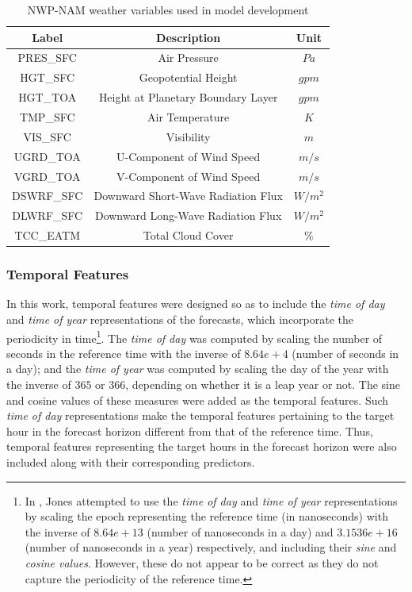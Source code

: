 \begin{table}[h]
\begin{center}
    \caption{NWP-NAM weather variables used in model development}
    \label{Tab:table_nam_variables}
    \begin{tabular}{ c c c}
    	\toprule
    	\textbf{Label} & \textbf{Description} & \textbf{Unit} \\
    	\midrule
    	PRES\_SFC & Air Pressure & $Pa$\\
    	HGT\_SFC & Geopotential Height & $gpm$ \\
    	HGT\_TOA & Height at Planetary Boundary Layer & $gpm$ \\
    	TMP\_SFC & Air Temperature & $K$\\
    	VIS\_SFC & Visibility & $m$\\
    	UGRD\_TOA & U-Component of Wind Speed & $m/s$\\
    	VGRD\_TOA & V-Component of Wind Speed & $m/s$\\
    	DSWRF\_SFC & Downward Short-Wave Radiation Flux & $W/m^2$\\
    	DLWRF\_SFC & Downward Long-Wave Radiation Flux & $W/m^2$\\
    	TCC\_EATM & Total Cloud Cover & $\%$ \\
    	\bottomrule
    \end{tabular}
\end{center}
\end{table}

\subsubsection*{Temporal Features}
\par In this work, temporal features were designed so as to include the \textit{time of day} and \textit{time of year} representations of the forecasts, which incorporate the periodicity in time\footnote{In \cite{thesis_zach}, Jones attempted to use the \textit{time of day} and \textit{time of year} representations by scaling the epoch representing the reference time (in nanoseconds) with the inverse of $8.64e+13$ (number of nanoseconds in a day) and $3.1536e+16$ (number of nanoseconds in a year) respectively, and including their \textit{sine} and \textit{cosine values}. However, these do not appear to be correct as they do not capture the periodicity of the reference time.}. The \textit{time of day} was computed by scaling the number of seconds in the reference time with the inverse of $8.64e+4$ (number of seconds in a day); and the \textit{time of year} was computed by scaling the day of the year with the inverse of $365$ or $366$, depending on whether it is a leap year or not. The sine and cosine values of these measures were added as the temporal features. Such \textit{time of day} representations make the temporal features pertaining to the target hour in the forecast horizon different from that of the reference time. Thus, temporal features representing the target hours in the forecast horizon were also included along with their corresponding predictors.

